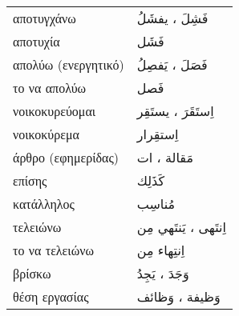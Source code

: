 \documentclass[twocolumn,a4paper]{article}
\newcommand{\ar}[1]{\textarabic{#1}}
\newcommand{\pl}{\raisebox{0.15ex}{\footnotesize ◍}}
\newcommand{\normpl}[1]{\ar{ #1، ات }}
\newcommand{\vrf}{\raisebox{0.15ex}{\footnotesize ◉}}
\newcommand{\mas}{\raisebox{0.15ex}{\footnotesize ◫}}
\begin{document}
\begin{mpsupertabular}{ P{0.5\textwidth} P{0.5\textwidth} }
αποτυγχάνω \vrf              & \ar{ فَشِلَ ، يفشَلُ } \\
αποτυχία \mas                & \ar{ فَشَل } \\
απολύω (ενεργητικό) \vrf     & \ar{ فَصَلَ ، يَفصِلُ } \\
το να απολύω \mas            & \ar{ فَصل } \\
νοικοκυρεύομαι \vrf          & \ar{ اِستَقَرَ ، يستَقِر } \\
νοικοκύρεμα \mas             & \ar{ اِستقِرار } \\
άρθρο (εφημερίδας) \pl       & \normpl{ مَقالة } \\
επίσης                       & \ar{ كَذَلِك } \\
κατάλληλος                   & \ar{ مُناسِب } \\
τελειώνω \vrf                & \ar{ اِنتَهى ، يَنتَهي مِن } \\
το να τελειώνω \mas          & \ar{ اِنتِهاء مِن } \\
βρίσκω \vrf                  & \ar{ وَجَدَ ، يَجِدُ } \\
θέση εργασίας \pl            & \ar{ وَظيفة ، وَظائف } \\


\end{mpsupertabular}
\end{document}
